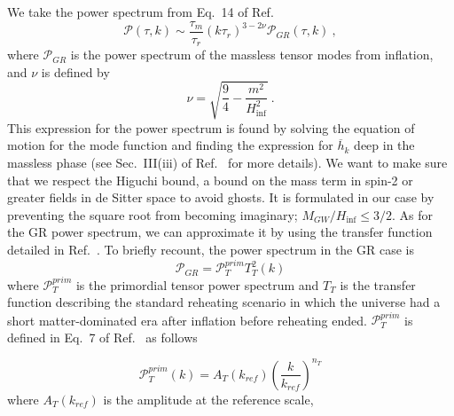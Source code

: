 \documentclass[prd,twocolumn,aps,psfig,nofootinbib,nobibnotes,superscriptaddress,preprintnumbers,times]{revtex4-2}
\begin{document}
We take the power spectrum from Eq.\ 14 of Ref.\ \cite{Fujita:2018}
\begin{equation}\label{eqn:p_sfm}
    \mathcal{P}(\tau, k) \sim \frac{\tau_m}{\tau_r}(k\tau_r)^{3-2\nu}\mathcal{P}_{GR}(\tau,k)\ , 
\end{equation}
where $\mathcal{P}_{GR}$ is the power spectrum of the massless tensor modes from inflation, and $\nu$ is defined by 
\begin{equation}\label{eqn:nu}
    \nu = \sqrt{\frac{9}{4} - \frac{m^2}{H_{\inf}^2}}\ .
\end{equation}
This expression for the power spectrum is found by solving the equation of motion for the mode function and finding the expression for $\overline{h}_k$ deep in the massless phase (see Sec.\ III(iii) of Ref.\ \cite{Fujita:2018} for more details). We want to make sure that we respect the Higuchi bound, a bound on the mass term in spin-2 or greater fields in de Sitter space to avoid ghosts. It is formulated in our case by preventing the square root from becoming imaginary; $M_{GW}/H_{\inf} \leq 3/2$. As for the GR power spectrum, we can approximate it by using the transfer function detailed in Ref.\ \cite{Kuroyanagi:2015}. To briefly recount, the power spectrum in the GR case is 
\begin{equation}\label{eqn:p_gr_sfm}
    \mathcal{P}_{GR} = \mathcal{P}^{prim}_{T} T^2_T(k)
\end{equation}
where $\mathcal{P}^{prim}_{T}$ is the primordial tensor power spectrum and $T_{T}$ is the transfer function describing the standard reheating scenario in which the universe had a short matter-dominated era after inflation before reheating ended. $\mathcal{P}^{prim}_{T}$ is defined 
in Eq.\ 7 of Ref.\ \cite{Kuroyanagi:2015} as follows

\begin{equation}\label{eqn:pt}
    \mathcal{P}_{T}^{prim}(k) = A_T(k_{ref})\left(\frac{k}{k_{ref}}\right)^{n_T}
\end{equation}
where $A_T(k_{ref})$ is the amplitude at the reference scale,

\end{document}
